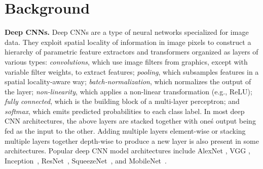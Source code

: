 \section{Background}

\vspace{2mm}
\noindent \textbf{Deep CNNs.} Deep CNNs are a type of neural networks specialized for image data.
They exploit spatial locality of information in image pixels to construct a hierarchy of parametric feature extractors and transformers organized as layers of various types: \textit{convolutions}, which use image
filters from graphics, except with variable filter weights, to extract features; \textit{pooling}, which subsamples features in a spatial
locality-aware way; \textit{batch-normalization}, which normalizes the output of the layer; \textit{non-linearity}, which applies a non-linear transformation (e.g., ReLU); \textit{fully connected}, which is the building block of a multi-layer perceptron; and \textit{softmax}, which emits predicted probabilities to each class label.
In most deep CNN architectures, the above layers are stacked together with one\'s output being fed as the input to the other.
Adding multiple layers element-wise or stacking multiple layers together depth-wise to produce a new layer is also present in some architectures.
Popular deep CNN model architectures include AlexNet \cite{alexnet}, VGG \cite{vggnet}, Inception~\cite{inception}, ResNet~\cite{resnet}, SqueezeNet~\cite{squeezenet}, and MobileNet~\cite{mobilenets}.

